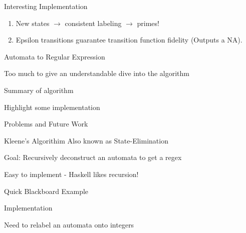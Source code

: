 \documentclass{beamer}
\begin{document}
\begin{frame}{Interesting Implementation}
	\large
	\begin{enumerate}[]
		\item New states $\rightarrow$ consistent labeling $\rightarrow$ primes!
		\item Epsilon transitions guarantee transition function fidelity (Outputs a NA). 
		
	\end{enumerate}
\end{frame}

\begin{frame}{Automata to Regular Expression}
	\centering \Large
	
	Too much to give an understandable dive into the algorithm
	
	\vspace{5mm}
	
	Summary of algorithm
	
	\vspace{5mm}
	
	Highlight some implementation
	
	\vspace{5mm}
	
	Problems and Future Work
\end{frame}

\begin{frame}{Kleene's Algorithim}
	\centering\Large
	Also known as State-Elimination
	
	\vspace{5mm}
	
	Goal: Recursively deconstruct an automata to get a regex
	
	\vspace{5mm}
	
	Easy to implement - Haskell likes recursion!
	
	\vspace{5mm}
	
	Quick Blackboard Example
	
\end{frame}

\begin{frame}[fragile]{Implementation}
	\large
	\begin{center}Need to relabel an automata onto integers 
	\end{center}
	
\end{frame}
\end{document}
